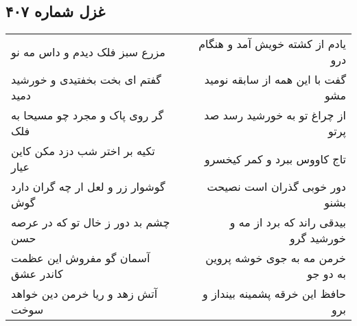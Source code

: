 \begin{center}
\section*{غزل شماره ۴۰۷}
\label{sec:sh407}
\begin{longtable}{l p{0.5cm} r}
مزرع سبز فلک دیدم و داس مه نو
&&
یادم از کشته خویش آمد و هنگام درو
\\
گفتم ای بخت بخفتیدی و خورشید دمید
&&
گفت با این همه از سابقه نومید مشو
\\
گر روی پاک و مجرد چو مسیحا به فلک
&&
از چراغ تو به خورشید رسد صد پرتو
\\
تکیه بر اختر شب دزد مکن کاین عیار
&&
تاج کاووس ببرد و کمر کیخسرو
\\
گوشوار زر و لعل ار چه گران دارد گوش
&&
دور خوبی گذران است نصیحت بشنو
\\
چشم بد دور ز خال تو که در عرصه حسن
&&
بیدقی راند که برد از مه و خورشید گرو
\\
آسمان گو مفروش این عظمت کاندر عشق
&&
خرمن مه به جوی خوشه پروین به دو جو
\\
آتش زهد و ریا خرمن دین خواهد سوخت
&&
حافظ این خرقه پشمینه بینداز و برو
\\
\end{longtable}
\end{center}
